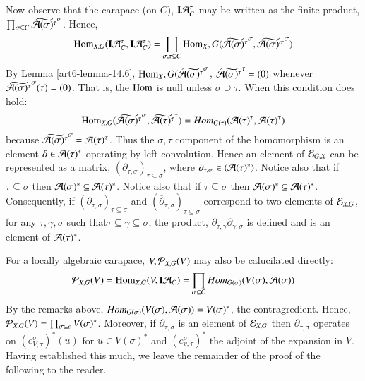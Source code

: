 Now observe that the carapace (on $C$), $\mathbf{I}\mathcal{A}_{C}^{\tau}$ may be written as the finite product, $\prod_{\sigma \subseteq C}\widetilde{\mathcal{A}(\sigma)^{\tau}}^{\sigma}$. Hence,
\begin{equation}\label{art6-eq-15.1}
\operatorname{Hom}_{X, G}(\mathbf{I} \mathcal{A}_{C}^{\tau}, \mathbf{I}\mathcal{A}_{C}^{\tau}) = \prod_{\sigma, \tau \subseteq C}\operatorname{Hom}_{X}, G(\widetilde{\mathcal{A}(\sigma)^{\tau}}^{\sigma}, \widetilde{\mathcal{A}(\sigma)^{\sigma}}^{\sigma})
\end{equation}
By Lemma \ref{art6-lemma-14.6}, $\operatorname{Hom}_{X}, G(\widetilde{\mathcal{A}(\sigma)^\tau}^{\sigma}$, $\widetilde{\mathcal{A}(\sigma)^\tau}^{\tau} = (0)$ whenever $\widetilde{\calA(\sigma)^{\tau}}^{\sigma}(\tau)\break = (0)$. That is, the $\operatorname{Hom}$ is null unless $\sigma \supseteq \tau$. When this condition does hold:
$$
\operatorname{Hom}_{X, G}(\widetilde{\mathcal{A}(\sigma)^{\tau}}^{\sigma}, \widetilde{\mathcal{A}(\tau)^\tau}^{\tau}) = Hom_{G(\tau)}(\mathcal{A}(\tau)^{\tau}, \mathcal{A}(\tau)^{\tau})
$$
because $\widetilde{\mathcal{A}(\sigma)^{\tau}}^{\sigma} = \mathcal{A}(\tau)^{\tau}$. Thus the $\sigma, \tau$ component of the homomorphism is an element $\partial \in \mathcal{A}(\tau)^{*}$ operating by left convolution. Hence an element of $\mathcal{E}_{G, X}$ can be represented as a matrix, $(\partial_{\tau, \sigma})_{\tau \subseteq \sigma}$, where $\partial_{\tau, \sigma} \in (\mathcal{A}(\tau)^{*})$. Notice also that if $\tau \subseteq \sigma$ then $\mathcal{A}(\sigma)^{*} \subseteq \mathcal{A}(\tau)^{*}$. Notice also that if $\tau \subseteq \sigma$ then $\mathcal{A}(\sigma)^{*} \subseteq \mathcal{A}(\tau)^{*}$. Consequently, if $(\partial_{\tau, \sigma})_{\tau \subseteq \sigma}$ and $(\overline{\partial}_{\tau, \sigma})_{\tau \subseteq \sigma}$ correspond to two elements of $\mathcal{E}_{X, G}$, for any $\tau, \gamma, \sigma$ such that$\tau \subseteq \gamma \subseteq \sigma$, the product, $\partial_{\tau, \gamma}\overline{\partial}_{\gamma, \sigma}$ is defined and is an element of $\mathcal{A}(\tau)^{*}$.

For a locally algebraic carapace, $V, \mathcal{P}_{X, G}(V)$ may also be calucilated directly: 
$$
\mathcal{P}_{X, G}(V)=  \operatorname{Hom}_{X, G}(V, \mathbf{I} \mathcal{A}_{C}) = \prod_{\sigma \subseteq C}Hom_{G(\sigma)}(V(\sigma), \mathcal{A}(\sigma))
$$
By the remarks above, $Hom_{G(\sigma)}(V(\sigma), \mathcal{A}(\sigma))= V(\sigma)^{*}$, the contragredient. Hence, $\mathcal{P}_{X, G}(V) = \prod_{\sigma \subseteq c}V(\sigma)^{*}$. Moreover, if $\partial_{\tau, \sigma}$ is an element of $\mathcal{E}_{X, G}$ then $\partial_{\tau, \sigma}$ operates on $\left(e_{V, \tau}^{\sigma}\right)^{*}(u)$ for $u \in V(\sigma)^{*}$ and $(e_{v, \tau}^{\sigma})^{*}$ the adjoint of the expansion in $V$. Having established this much, we leave the remainder of the proof of the following to the reader.

